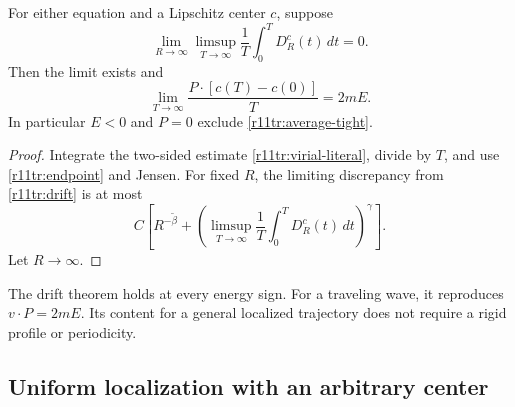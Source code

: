 \begin{theorem}
\label{thm:r11tr-drift}
For either equation and a Lipschitz center $c$, suppose
\begin{equation}\label{r11tr:average-tight}
 \lim_{R\to\infty}\limsup_{T\to\infty}\frac1T
                  \int_0^T D_R^c(t)\,dt=0.
\end{equation}
Then the limit exists and
\begin{equation}\label{r11tr:drift}
 \lim_{T\to\infty}\frac{P\cdot[c(T)-c(0)]}{T}=2mE.
\end{equation}
In particular $E<0$ and $P=0$ exclude
\eqref{r11tr:average-tight}.
\end{theorem}
\begin{proof}
Integrate the two-sided estimate \eqref{r11tr:virial-literal},
divide by $T$, and use \eqref{r11tr:endpoint} and Jensen.
For fixed $R$, the limiting discrepancy from \eqref{r11tr:drift}
is at most
\[
 C\left[R^{-\widetilde\beta}+
       \left(\limsup_{T\to\infty}\frac1T
                    \int_0^TD_R^c(t)\,dt\right)^\gamma\right].
\]
Let $R\to\infty$.
\end{proof}

The drift theorem holds at every energy sign. For a traveling wave,
it reproduces $v\cdot P=2mE$. Its content for a general localized
trajectory does not require a rigid profile or periodicity.

\subsection{Uniform localization with an arbitrary center}

